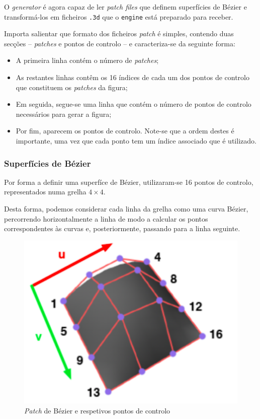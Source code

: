 \documentclass[a4paper, 11pt]{article}
\begin{document}
O \textit{generator} é agora capaz de ler \textit{patch files} que definem superfícies de Bézier 
e transformá-los em ficheiros \texttt{.3d} que o \texttt{engine} está preparado para receber. 

Importa salientar que formato dos ficheiros \textit{patch} é simples, contendo duas secções -- 
\textit{patches} e pontos de controlo -- e caracteriza-se da seguinte forma:

\begin{itemize}
    \item A primeira linha contém o número de \textit{patches};
    \item As restantes linhas contêm os 16 índices de cada um dos pontos de controlo que 
constituem os \textit{patches} da figura;
    \item Em seguida, segue-se uma linha que contém o número de pontos de controlo necessários 
para gerar a figura;
    \item Por fim, aparecem os pontos de controlo. Note-se que a ordem destes é importante, uma 
vez que cada ponto tem um índice associado que é utilizado.
\end{itemize}

\subsubsection*{Superfícies de Bézier}

Por forma a definir uma superfíce de Bézier, utilizaram-se 16 pontos de controlo, representados 
numa grelha $4\times4$. 

Desta forma, podemos considerar cada linha da grelha como uma curva Bézier, percorrendo 
horizontalmente a linha de modo a calcular os pontos correspondentes às curvas e, posteriormente, 
passando para a linha seguinte.

\begin{figure}[H]
    \centering
    \includegraphics[width=.4\textwidth]{img/uv.png}
    \caption{\textit{Patch} de Bézier e respetivos pontos de controlo}
\end{figure}
\end{document}
